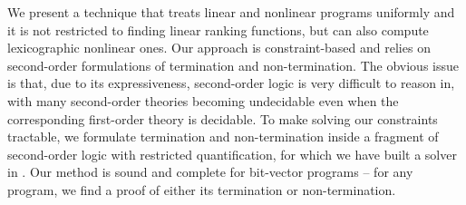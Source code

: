 \documentclass[a4paper]{llncs}
\begin{document}
We present a technique that treats linear and nonlinear programs uniformly and
it is not restricted to finding linear ranking functions, but can
also compute lexicographic nonlinear ones. 
Our approach is constraint-based and relies on second-order formulations 
of termination and non-termination.
The obvious issue is that,
due to its expressiveness, second-order logic is very difficult to reason
in, with many second-order theories becoming undecidable even when the
corresponding first-order theory is decidable.
To make solving our constraints tractable, we formulate termination and non-termination inside a fragment of second-order logic with restricted quantification, 
for which we have built a solver in \cite{kalashnikov}.
Our method is sound and
complete for bit-vector programs -- for any program, we find
a proof of either its termination or non-termination.





% 
\end{document}
